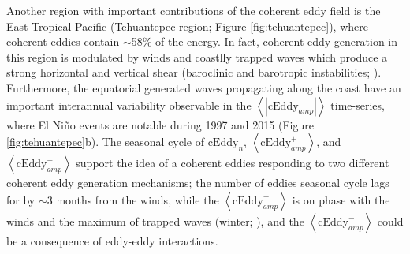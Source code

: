 \documentclass[draft,linenumbers]{agujournal2019}
\newcommand{\cEddy}{\textrm{cEddy}}
\begin{document}
	Another region with important contributions of the coherent eddy field is the East Tropical Pacific (Tehuantepec region; Figure \ref{fig:tehuantepec}), where coherent eddies contain $\sim$58\% of the energy. 
	In fact, coherent eddy generation in this region is modulated by winds and coastlly trapped waves which produce a strong horizontal and vertical shear (baroclinic and barotropic instabilities; \citealp{Zamudio_Tehuantepec_2006}). 
	Furthermore, the equatorial generated waves propagating along the coast have an important interannual variability observable in the $\left<|\cEddy_{amp}|\right>$ time-series, where El Niño events are notable during 1997 and 2015 (Figure \ref{fig:tehuantepec}b). 
	The seasonal cycle of $\cEddy_{n}$, $\left<\cEddy_{amp}^+\right>$, and $\left<\cEddy_{amp}^-\right>$ support the idea of a coherent eddies responding to two different coherent eddy generation mechanisms; the number of eddies seasonal cycle lags for by $\sim$3 months from the winds, while the $\left<\cEddy_{amp}^+\right>$ is on phase with the winds and the maximum of trapped waves (winter; \citealp{Zamudio_Tehuantepec_2006}), and the $\left<\cEddy_{amp}^-\right>$ could be a consequence of eddy-eddy interactions. 

\end{document}
